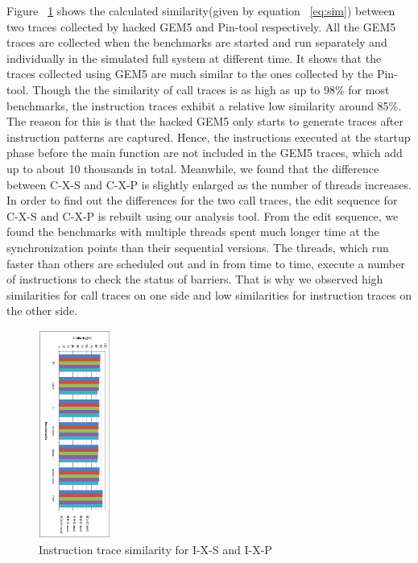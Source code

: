 \documentclass[10pt,journal,cspaper,compsoc]{IEEEtran}
\begin{document}
Figure ~\ref{fig:x86_sis_sim} shows the calculated similarity(given
by equation ~\ref{eq:sim}) between two traces collected by hacked
GEM5 and Pin-tool respectively. All the GEM5 traces are collected
when the benchmarks are started and run separately and individually
in the simulated full system at different time. It shows that the
traces collected using GEM5 are much similar to the ones collected
by the Pin-tool. Though the the similarity of call traces is as high
as up to 98\% for most benchmarks, the instruction traces exhibit a
relative low similarity around 85\%. The reason for this is that the
hacked GEM5 only starts to generate traces after instruction
patterns are captured. Hence, the instructions executed at the
startup phase before the main function are not included in the GEM5
traces, which add up to about 10 thousands in total. Meanwhile, we
found that the difference between C-X-S and C-X-P is slightly
enlarged as the number of threads increases. In order to find out
the differences for the two call traces, the edit sequence for C-X-S
and C-X-P is rebuilt using our analysis tool. From the edit
sequence, we found the benchmarks with multiple threads spent much
longer time at the synchronization points than their sequential
versions. The threads, which run faster than others are scheduled
out and in from time to time, execute a number of instructions to
check the status of barriers. That is why we observed high
similarities for call traces on one side and low similarities for
instruction traces on the other side.

\begin{figure}
\centering
\includegraphics[width=0.21\textwidth, angle=90]{fig/x86_s_sim1.eps}
\caption{Instruction trace similarity for I-X-S and I-X-P}
\label{fig:x86_sis_sim}       %
\end{figure}
\end{document}
